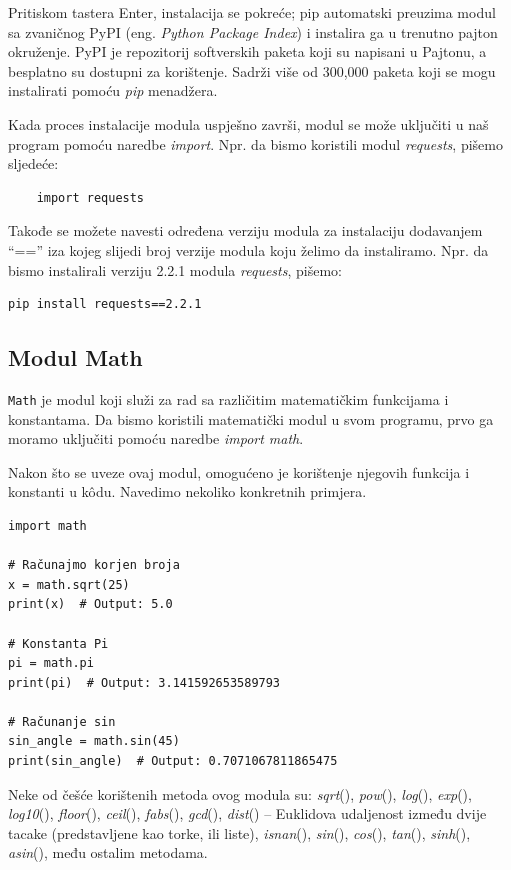 Pritiskom tastera Enter, instalacija se pokreće; pip automatski preuzima modul sa zvaničnog PyPI (eng. \textit{Python Package Index}) i instalira ga u trenutno pajton okruženje. PyPI je repozitorij softverskih paketa koji su napisani u Pajtonu, a besplatno su dostupni za korištenje. Sadrži više od 300,000 paketa koji se mogu instalirati pomoću \textit{pip} menadžera.


Kada proces instalacije modula uspješno završi, modul se može uključiti u naš program pomoću naredbe \textit{import}. Npr. da bismo koristili modul \textit{requests}, pišemo sljedeće:
\begin{verbatim}
    import requests
\end{verbatim}
Takođe se možete navesti određena verziju modula za instalaciju doda\-vanjem  ``==''  iza kojeg slijedi broj verzije modula koju želimo da instali\-ramo. Npr. da bismo instalirali verziju 2.2.1 modula \textit{requests},  pišemo:
\begin{verbatim}
pip install requests==2.2.1
\end{verbatim}


\subsection{Modul Math}

\texttt{Math} je modul koji služi za rad sa različitim matematičkim funkcijama i konstantama. Da bismo koristili matematički modul u svom programu, prvo ga moramo uključiti pomoću naredbe \textit{import math}.

Nakon što se uveze ovaj modul, omogućeno je korištenje njegovih funkcija i konstanti u k\^odu. Navedimo nekoliko konkretnih primjera. 

\begin{verbatim}
import math

# Računajmo korjen broja
x = math.sqrt(25)
print(x)  # Output: 5.0

# Konstanta Pi
pi = math.pi
print(pi)  # Output: 3.141592653589793

# Računanje sin 
sin_angle = math.sin(45)
print(sin_angle)  # Output: 0.7071067811865475
\end{verbatim}

Neke od češće korištenih metoda ovog modula su:   \textit{sqrt}(), \textit{pow}(), \textit{log}(), \textit{exp}(), \textit{log10}(), \textit{floor}(), \textit{ceil}(), \textit{fabs}(), \textit{gcd}(), \textit{dist}() – Euklidova udaljenost između dvije tacake (predstavljene kao torke, ili liste), \textit{isnan}(), \textit{sin}(), \textit{cos}(), \textit{tan}(), \textit{sinh}(), \textit{asin}(), među ostalim metodama. \\

